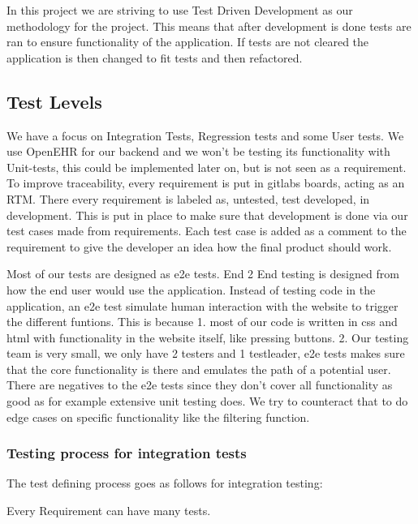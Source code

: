 In this project we are striving to use Test Driven Development as our methodology for the project. This means that after development is done tests are ran to ensure functionality of the application. If tests are not cleared the application is then changed to fit tests and then refactored.



\subsection{Test Levels}
We have a focus on Integration Tests, Regression tests and some User tests. We use OpenEHR for our backend and we won't be testing its functionality with Unit-tests, this could be implemented later on, but is not seen as a requirement. To improve traceability, every requirement is put in gitlabs boards, acting as an RTM. There every requirement is labeled as, untested, test developed, in development. This is put in place to make sure that development is done via our test cases made from requirements. Each test case is added as a comment to the requirement to give the developer an idea how the final product should work.



Most of our tests are designed as e2e tests. End 2 End testing is designed from how the end user would use the application. Instead of testing code in the application, an e2e test simulate human interaction with the website to trigger the different funtions. This is because 1. most of our code is written in css and html with functionality in the website itself, like pressing buttons. 2. Our testing team is very small, we only have 2 testers and 1 testleader, e2e tests makes sure that the core functionality is there and emulates the path of a potential user. There are negatives to the e2e tests since they don't cover all functionality as good as for example extensive unit testing does. We try to counteract that to do edge cases on specific functionality like the filtering function. 
\subsubsection{Testing process for integration tests}
The test defining process goes as follows for integration testing:

Every Requirement can have many tests.

